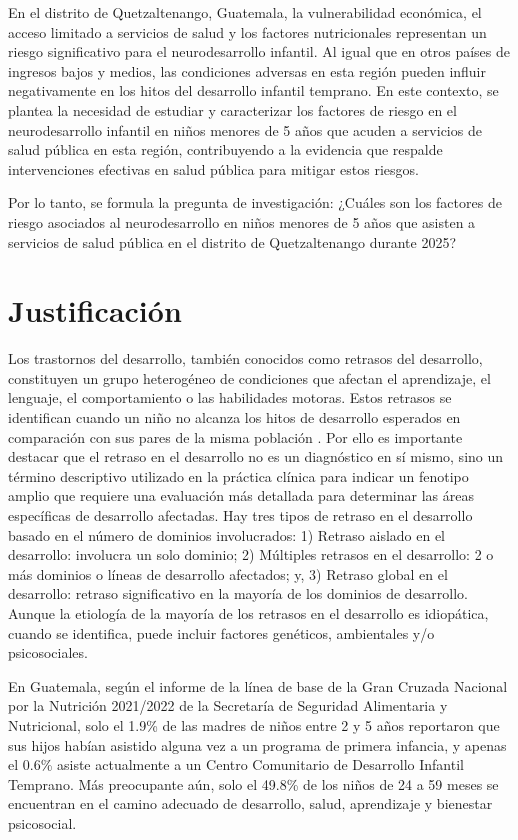 \documentclass[11pt,letterpaper]{report}
\begin{document}
En el distrito de Quetzaltenango, Guatemala, la vulnerabilidad económica, el
acceso limitado a servicios de salud y los factores nutricionales representan
un riesgo significativo para el neurodesarrollo infantil. Al igual que en otros
países de ingresos bajos y medios, las condiciones adversas en esta región
pueden influir negativamente en los hitos del desarrollo infantil temprano. En
este contexto, se plantea la necesidad de estudiar y caracterizar los factores
de riesgo en el neurodesarrollo infantil en niños menores de 5 años que acuden
a servicios de salud pública en esta región, contribuyendo a la evidencia que
respalde intervenciones efectivas en salud pública para mitigar estos riesgos.

Por lo tanto, se formula la pregunta de investigación: ¿Cuáles son los factores
de riesgo asociados al neurodesarrollo en niños menores de 5 años que asisten a
servicios de salud pública en el distrito de Quetzaltenango durante 2025?

	\chapter*{Justificación}
Los trastornos del desarrollo, también conocidos como retrasos del desarrollo,
constituyen un grupo heterogéneo de condiciones que afectan el aprendizaje, el
lenguaje, el comportamiento o las habilidades motoras.
\cite{cdcDevelopmentalDisability} Estos retrasos se identifican cuando un niño
no alcanza los hitos de desarrollo esperados en comparación con sus pares de la
misma población \cite{DevelopmentalSurveillance}. Por ello es importante
destacar que el retraso en el desarrollo no es un diagnóstico en sí mismo, sino
un término descriptivo utilizado en la práctica clínica para indicar un
fenotipo amplio que requiere una evaluación más detallada para determinar las
áreas específicas de desarrollo afectadas. Hay tres tipos de retraso en el
desarrollo basado en el número de dominios involucrados: 1) Retraso aislado en
el desarrollo: involucra un solo dominio; 2) Múltiples retrasos en el
desarrollo: 2 o más dominios o líneas de desarrollo afectados; y, 3) Retraso
global en el desarrollo: retraso significativo en la mayoría de los dominios de
desarrollo. \cite{Bellman2013} Aunque la etiología de la mayoría de los
retrasos en el desarrollo es idiopática, cuando se identifica, puede incluir
factores genéticos, ambientales y/o psicosociales. \cite{DevelopmentalDelay}

En Guatemala, según el informe de la línea de base de la Gran Cruzada Nacional
por la Nutrición 2021/2022 de la Secretaría de Seguridad Alimentaria y
Nutricional, solo el 1.9\% de las madres de niños entre 2 y 5 años reportaron
que sus hijos habían asistido alguna vez a un programa de primera infancia, y
apenas el 0.6\% asiste actualmente a un Centro Comunitario de Desarrollo
Infantil Temprano. Más preocupante aún, solo el 49.8\% de los niños de 24 a 59
meses se encuentran en el camino adecuado de desarrollo, salud, aprendizaje y
bienestar psicosocial. \cite{SESAN2022}
\end{document}
